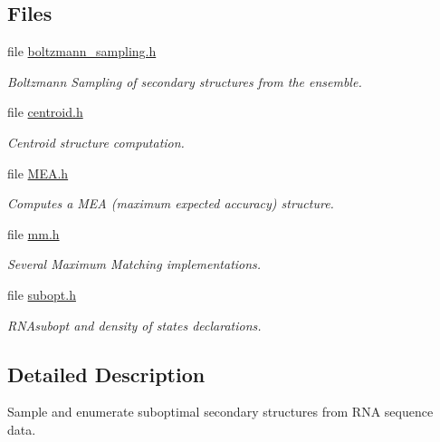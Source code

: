\subsection*{Files}
\begin{DoxyCompactItemize}
\item 
file \hyperlink{boltzmann__sampling_8h}{boltzmann\+\_\+sampling.\+h}
\begin{DoxyCompactList}\small\item\em Boltzmann Sampling of secondary structures from the ensemble. \end{DoxyCompactList}\item 
file \hyperlink{centroid_8h}{centroid.\+h}
\begin{DoxyCompactList}\small\item\em Centroid structure computation. \end{DoxyCompactList}\item 
file \hyperlink{MEA_8h}{M\+E\+A.\+h}
\begin{DoxyCompactList}\small\item\em Computes a M\+EA (maximum expected accuracy) structure. \end{DoxyCompactList}\item 
file \hyperlink{mm_8h}{mm.\+h}
\begin{DoxyCompactList}\small\item\em Several Maximum Matching implementations. \end{DoxyCompactList}\item 
file \hyperlink{subopt_8h}{subopt.\+h}
\begin{DoxyCompactList}\small\item\em R\+N\+Asubopt and density of states declarations. \end{DoxyCompactList}\end{DoxyCompactItemize}


\subsection{Detailed Description}
Sample and enumerate suboptimal secondary structures from R\+NA sequence data. 

